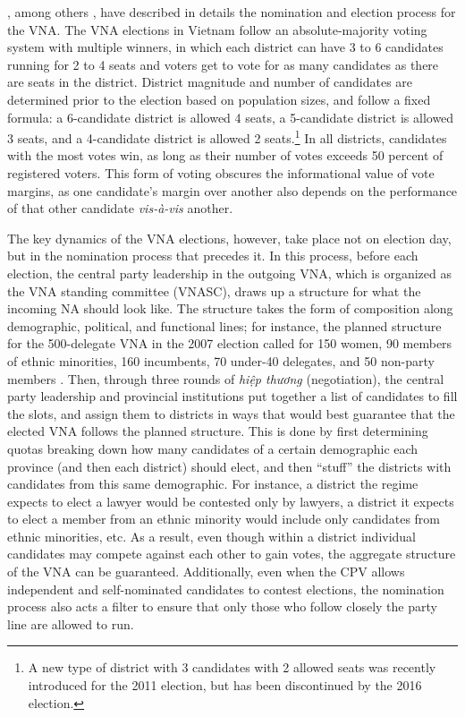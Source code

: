 \documentclass[12pt]{article}\usepackage[]{graphicx}\usepackage[]{color}
\newcommand{\1}{\mathbbm{1}}
\begin{document}
\cite{MaleskySchuler2011}, among others \citep[e.g][]{Gainsborough2005}, have described in details the nomination and election process for the VNA. The VNA elections in Vietnam follow an absolute-majority voting system with multiple winners, in which each district can have 3 to 6 candidates running for 2 to 4 seats and voters get to vote for as many candidates as there are seats in the district. District magnitude and number of candidates are determined prior to the election based on population sizes, and follow a fixed formula: a 6-candidate district is allowed 4 seats, a 5-candidate district is allowed 3 seats, and a 4-candidate district is allowed 2 seats.\footnote{A new type of district with 3 candidates with 2 allowed seats was recently introduced for the 2011 election, but has been discontinued by the 2016 election.} In all districts, candidates with the most votes win, as long as their number of votes exceeds 50 percent of registered voters. This form of voting obscures the informational value of vote margins, as one candidate's margin over another also depends on the performance of that other candidate \textit{vis-\`{a}-vis} another.

The key dynamics of the VNA elections, however, take place not on election day, but in the nomination process that precedes it. In this process, before each election, the central party leadership in the outgoing VNA, which is organized as the VNA standing committee (VNASC), draws up a structure for what the incoming NA should look like. The structure takes the form of composition along demographic, political, and functional lines; for instance, the planned structure for the 500-delegate VNA in the 2007 election called for 150 women, 90 members of ethnic minorities, 160 incumbents, 70 under-40 delegates, and 50 non-party members  \citep[506]{MaleskySchuler2011}. Then, through three rounds of \textit{hiệp thương} (negotiation), the central party leadership and provincial institutions put together a list of candidates to fill the slots, and assign them to districts in ways that would best guarantee that the elected VNA follows the planned structure. This is done by first determining quotas breaking down how many candidates of a certain demographic each province (and then each district) should elect, and then ``stuff'' the districts with candidates from this same demographic. For instance, a district the regime expects to elect a lawyer would be contested only by lawyers, a district it expects to elect a member from an ethnic minority would include only candidates from ethnic minorities, etc. As a result, even though within a district individual candidates may compete against each other to gain votes, the aggregate structure of the VNA can be guaranteed. Additionally, even when the CPV allows independent and self-nominated candidates to contest elections, the nomination process also acts a filter to ensure that only those who follow closely the party line are allowed to run.
\end{document}
